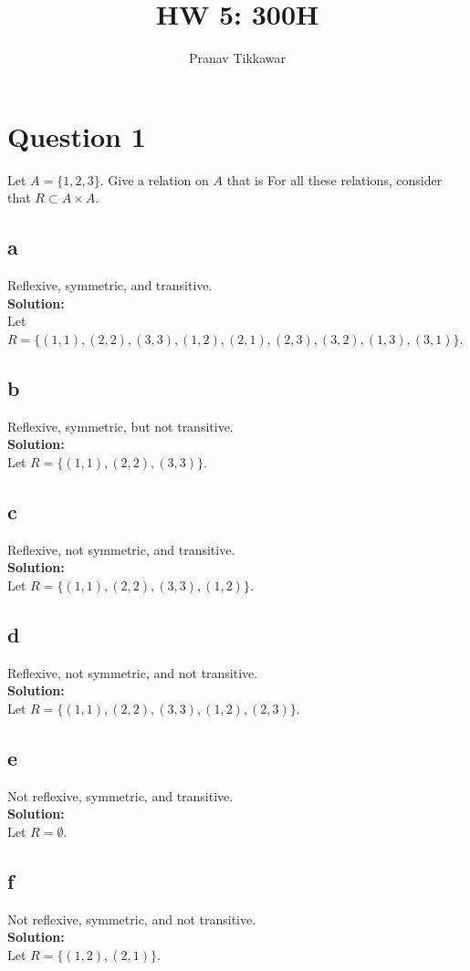 \documentclass{article}
\author{Pranav Tikkawar}
\title{HW 5: 300H}
\begin{document}
\maketitle
\section*{Question 1}
Let $A = \{1,2,3\}$. Give a relation on $A$ that is
For all these relations, consider that $R \subset A \times A$.
\subsection*{a}
Reflexive, symmetric, and transitive.\\
\textbf{Solution:}\\
Let $R = \{(1,1), (2,2), (3,3), (1,2), (2,1), (2,3), (3,2), (1,3), (3,1)\}$.
\subsection*{b}
Reflexive, symmetric, but not transitive. \\
\textbf{Solution:}\\
Let $R = \{(1,1), (2,2), (3,3)\}$.
\subsection*{c}
Reflexive, not symmetric, and transitive.\\
\textbf{Solution:}\\
Let $R = \{(1,1), (2,2), (3,3), (1,2)\}$.
\subsection*{d}
Reflexive, not symmetric, and not transitive.\\
\textbf{Solution:}\\
Let $R = \{(1,1), (2,2), (3,3), (1,2), (2,3)\}$.
\subsection*{e}
Not reflexive, symmetric, and transitive.\\
\textbf{Solution:}\\
Let $R = \emptyset $.
\subsection*{f}
Not reflexive, symmetric, and not transitive.\\
\textbf{Solution:}\\
Let $R = \{(1,2), (2,1)\}$.
\end{document}

